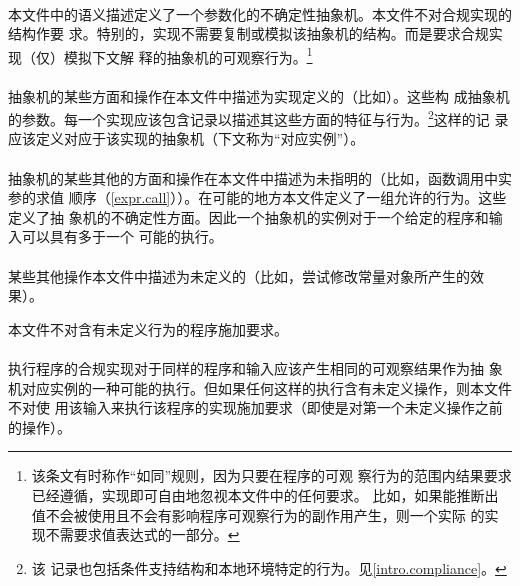 \paragraph{} %
本文件中的语义描述定义了一个参数化的不确定性抽象机。本文件不对合规实现的结构作要
求。特别的，实现不需要复制或模拟该抽象机的结构。而是要求合规实现（仅）模拟下文解
释的抽象机的可观察行为。\footnote{该条文有时称作“如同”规则，因为只要在程序的可观
察行为的范围内结果要求已经遵循，实现即可自由地忽视本文件中的任何要求。
比如，如果能推断出值不会被使用且不会有影响程序可观察行为的副作用产生，则一个实际
的实现不需要求值表达式的一部分。}

\paragraph{} %
抽象机的某些方面和操作在本文件中描述为实现定义的（比如）。这些构
成抽象机的参数。每一个实现应该包含记录以描述其这些方面的特征与行为。\footnote{该
记录也包括条件支持结构和本地环境特定的行为。见\ref{intro.compliance}。}这样的记
录应该定义对应于该实现的抽象机（下文称为“对应实例”）。

\paragraph{} %
抽象机的某些其他的方面和操作在本文件中描述为未指明的（比如，函数调用中实参的求值
顺序（\ref{expr.call}））。在可能的地方本文件定义了一组允许的行为。这些定义了抽
象机的不确定性方面。因此一个抽象机的实例对于一个给定的程序和输入可以具有多于一个
可能的执行。

\paragraph{} %
某些其他操作本文件中描述为未定义的（比如，尝试修改常量对象所产生的效果）。

\begin{note}
本文件不对含有未定义行为的程序施加要求。
\end{note}

\paragraph{} %
执行\wellform{}程序的合规实现对于同样的程序和输入应该产生相同的可观察结果作为抽
象机对应实例的一种可能的执行。但如果任何这样的执行含有未定义操作，则本文件不对使
用该输入来执行该程序的实现施加要求（即使是对第一个未定义操作之前的操作）。


